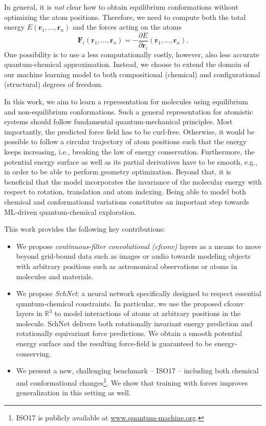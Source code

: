 \documentclass{article}
\newcommand{\rr}{\mathbf{r}}
\begin{document}
In general, it is \emph{not} clear how to obtain equilibrium conformations without optimizing the atom positions.
Therefore, we need to compute both the total energy $E(\rr_1, \dots, \rr_n)$ and the forces acting on the atoms
\begin{equation}
\textbf{F}_i (\rr_1, \dots, \rr_n) = - \frac{\partial E}{\partial \mathbf{r}_i} (\rr_1, \dots, \rr_n). \label{eq:force}
\end{equation}
One possibility is to use a less computationally costly, however, also less accurate quantum-chemical approximation.
Instead, we choose to extend the domain of our machine learning model to both compositional (chemical) and configurational (structural) degrees of freedom.

In this work, we aim to learn a representation for molecules using equilibrium and non-equilibrium conformations.
Such a general representation for atomistic systems should follow fundamental quantum-mechanical principles.
Most importantly, the predicted force field has to be curl-free.
Otherwise, it would be possible to follow a circular trajectory of atom positions such that the energy keeps increasing, i.e., breaking the law of energy conservation.
Furthermore, the potential energy surface as well as its partial derivatives have to be smooth, e.g., in order to be able to perform geometry optimization.
Beyond that, it is beneficial that the model incorporates the invariance of the molecular energy with respect to rotation, translation and atom indexing.
Being able to model both chemical and conformational variations constitutes an important step towards ML-driven quantum-chemical exploration.

This work provides the following key contributions:
\begin{itemize}
\item We propose \emph{continuous-filter convolutional (cfconv)} layers as a means to move beyond grid-bound data such as images or audio towards modeling objects with arbitrary positions such as astronomical observations or atoms in molecules and materials.
\item We propose \emph{SchNet}: a neural network specifically designed to respect essential quantum-chemical constraints. 
In particular, we use the proposed cfconv layers in $\mathbb{R}^3$ to model interactions of atoms at arbitrary positions in the molecule.
SchNet delivers both rotationally invariant energy prediction and rotationally equivariant force predictions. 
We obtain a smooth potential energy surface and the resulting force-field is guaranteed to be energy-conserving.
\item We present a new, challenging benchmark -- ISO17 -- including both chemical and conformational changes\footnote{ISO17 is publicly available at \url{www.quantum-machine.org}.}.
We show that training with forces improves generalization in this setting as well.
\end{itemize}
\end{document}
